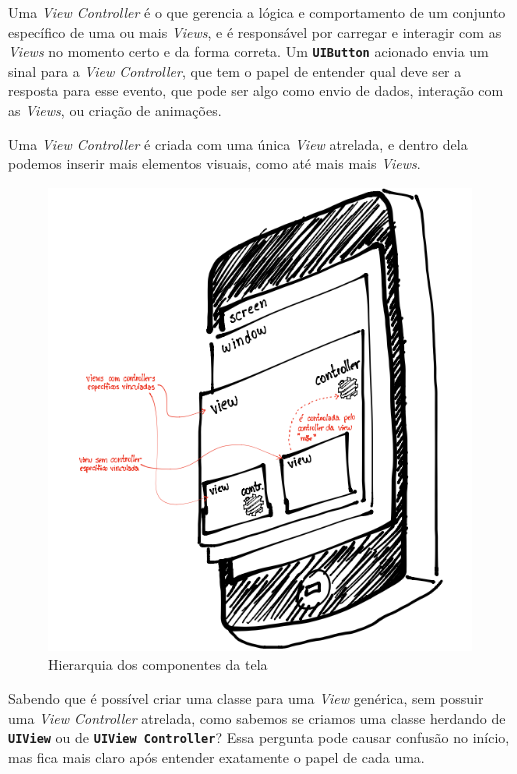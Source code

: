 \documentclass[a4paper,12pt,brazil,doubleside]{book}
\begin{document}
\begin{singlespace}
Uma \emph{View Controller} é o que gerencia a lógica e comportamento de um conjunto específico de uma ou mais \emph{Views}, e é responsável por carregar e interagir com as \emph{Views} no momento certo e da forma correta. Um \texttt{\textbf{UIButton}} acionado envia um sinal para a \emph{View Controller}, que tem o papel de entender qual deve ser a resposta para esse evento, que pode ser algo como envio de dados, interação com as \emph{Views}, ou criação de animações.

Uma \emph{View Controller} é criada com uma única \emph{View} atrelada, e dentro dela podemos inserir mais elementos visuais, como até mais mais \emph{Views}.

\bigskip

\begin{figure}[H]
  \centering
  \includegraphics[width=.75\textwidth]{figuras/screen_hierarchy.png}
  \caption{Hierarquia dos componentes da tela}
  \label{fig:a}
\end{figure}


Sabendo que é possível criar uma classe para uma \emph{View} genérica, sem possuir uma \emph{View Controller} atrelada, como sabemos se criamos uma classe herdando de \texttt{\textbf{UIView}} ou de \texttt{\textbf{UIView Controller}}? Essa pergunta pode causar confusão no início, mas fica mais claro após entender exatamente o papel de cada uma.


\end{singlespace}
\end{document}
